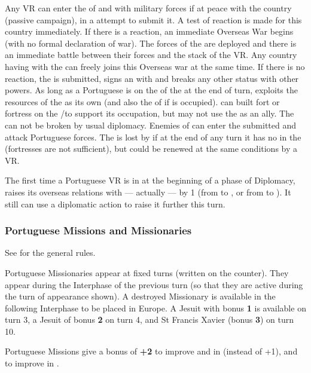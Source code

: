 \bparag Any VR can enter the \COL of  and  with
military forces if at peace with the country (passive campaign), in a
attempt to submit it. A test of reaction is made for this country
immediately.
\bparag If there is a reaction, an immediate Overseas War begins (with
no formal declaration of war). The forces of the \MIN are deployed and
there is an immediate battle between their forces and the stack of the
VR. Any country having \dipAT with the \MIN can freely joins this
Overseas war at the same time.
\bparag If there is no reaction, the \MIN is submitted, signs an \dipAT
with \POR and breaks any other status with other powers.  As long as a
Portuguese \LD is on the \COL of the \MIN at the end of turn, \POR
exploits the resources of the \COL as its own (and also the \TP of
 if  is occupied). \POR can built fort or
fortress on the \COL/\TP to support its occupation, but may not use the
\MIN as an ally. The \dipAT can not be broken by usual diplomacy.
\bparag Enemies of \POR can enter the submitted \MIN and attack
Portuguese forces. The \dipAT is lost by \POR if at the end of any turn
it has no \LD in the \COL (fortresses are not sufficient), but could be
renewed at the same conditions by a VR.

\bparag The first time a Portuguese VR is in  at the
beginning of a phase of Diplomacy, \POR raises its overseas relations
with  --- actually  --- by 1 (from \dipNR to \dipFR,
or from \dipFR to \dipAT). It still can use a diplomatic action to raise
it further this turn.

\subsubsection{Portuguese Missions and Missionaries}
\aparag See  for the general rules.

\aparag Portuguese Missionaries appear at fixed turns (written on the
counter). They appear during the Interphase of the previous turn (so
that they are active during the turn of appearance shown).
\bparag A destroyed Missionary is available in the following Interphase
to be placed in Europe.
\bparag A Jesuit with bonus {\bf 1} is available on turn 3, a Jesuit of
bonus {\bf 2} on turn 4, and St Francis Xavier (bonus {\bf 3}) on turn
10.

\aparag Portuguese Missions give a bonus of {\bf +2} to improve \TP and
\COL in  (instead of +1), and to improve \COL in
.

